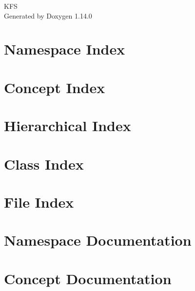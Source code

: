\documentclass[twoside]{book}
\newcommand{\+}{\discretionary{\mbox{\scriptsize$\hookleftarrow$}}{}{}}
\newcommand{\clearemptydoublepage}{%
    \newpage{\pagestyle{empty}\cleardoublepage}%
  }
\begin{document}
  \raggedbottom
    \hypersetup{pageanchor=false,
                bookmarksnumbered=true,
                pdfencoding=unicode
               }
  \begin{titlepage}
  \vspace*{7cm}
  \begin{center}%
  {\Large KFS}\\
  \vspace*{1cm}
  {\large Generated by Doxygen 1.14.0}\\
  \end{center}
  \end{titlepage}
  \clearemptydoublepage
  \tableofcontents
  \clearemptydoublepage
  \hypersetup{pageanchor=true}
\chapter{Namespace Index}

\chapter{Concept Index}

\chapter{Hierarchical Index}

\chapter{Class Index}

\chapter{File Index}

\chapter{Namespace Documentation}










\chapter{Concept Documentation}






\end{document}
